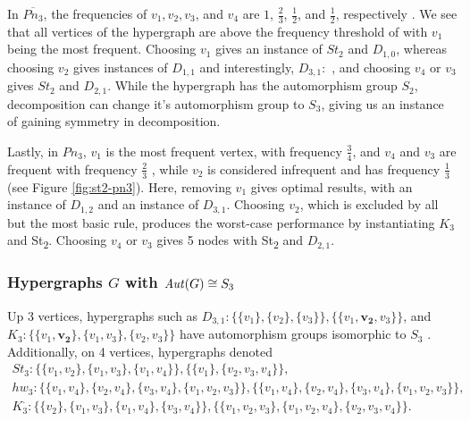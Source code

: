 In $\overline{Pn_3}$, the frequencies of $v_1,v_2,v_3$, and $v_4$ are $1$, $\frac{2}{3}$, $\frac{1}{2}$, and $\frac{1}{2}$, respectively . We see that all vertices of the hypergraph are above the frequency threshold of \FKA{} with $v_1$ being the most frequent. Choosing $v_1$ gives an instance of $St_2$ and $D_{1,0}$, whereas choosing $v_2$ gives instances of $D_{1,1}$ and interestingly, $D_{3,1}:$ , and choosing $v_4$ or $v_3$ gives $St_2$ and $D_{2,1}$. While the hypergraph has the automorphism group $S_2$, decomposition can change it's automorphism group to $S_3$, giving us an instance of gaining symmetry in \FKA{} decomposition.

Lastly, in $Pn_3$, $v_1$ is the most frequent vertex, with frequency $\frac{3}{4}$, and $v_4$ and $v_3$ are frequent with frequency $\frac{2}{3}$ , while $v_2$ is considered infrequent and has frequency $\frac{1}{3}$ (see Figure \ref{fig:st2-pn3}). Here, removing $v_1$ gives optimal results, with an instance of $D_{1,2}$ and an instance of $D_{3,1}$. Choosing $v_2$, which is excluded by all but the most basic rule, produces the worst-case performance by instantiating $K_3$ and St\textsubscript{2}. Choosing $v_4$ or $v_3$ gives 5 nodes with St\textsubscript{2} and $D_{2,1}$.

\subsubsection*{Hypergraphs $G$ with $\mathit{Aut}(G)\cong S_3$}

Up 3 vertices, hypergraphs such as  $D_{3,1}:\{\{v_1\},\{v_2\},\{v_3\}\},\{\{v_1,\mathbf{v_2},v_3\}\}$, and $K_3:\{\{v_1,\mathbf{v_2}\},\{v_1,v_3\},\{v_2,v_3\}\}$ have automorphism groups isomorphic to $S_3$ . Additionally, on 4 vertices, hypergraphs denoted
\begin{gather*}
St_3:\{\{v_1,v_2\},\{v_1,v_3\},\{v_1,v_4\}\},\{\{v_1\},\{v_2,v_3,v_4\}\},\\[4pt]
hw_3:\{\{v_1,v_4\},\{v_2,v_4\},\{v_3,v_4\},\{v_1,v_2,v_3\}\},\{\{v_1,v_4\},\{v_2,v_4\},\{v_3,v_4\},\{v_1,v_2,v_3\}\},\\[4pt]
K_3^{\cdot}:\{\{v_2\},\{v_1,v_3\},\{v_1,v_4\},\{v_3,v_4\}\},\{\{v_1,v_2,v_3\},\{v_1,v_2,v_4\},\{v_2,v_3,v_4\}\}.
\end{gather*}

